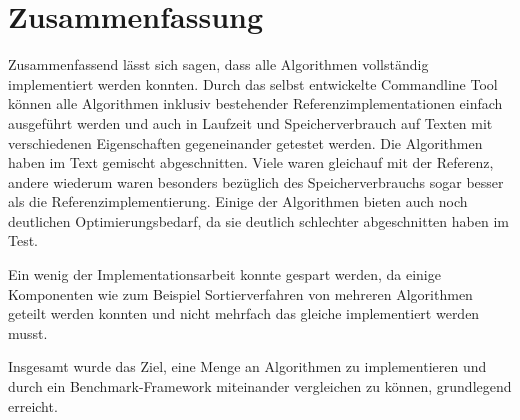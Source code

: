 \section{Zusammenfassung}

Zusammenfassend  lässt sich sagen,
dass alle Algorithmen vollständig implementiert werden konnten. Durch das selbst entwickelte
Commandline Tool können alle Algorithmen inklusiv bestehender Referenzimplementationen einfach ausgeführt werden
und auch in Laufzeit und Speicherverbrauch auf Texten mit verschiedenen Eigenschaften gegeneinander getestet werden.
Die Algorithmen haben im Text gemischt abgeschnitten.
Viele waren gleichauf mit der Referenz, andere wiederum waren besonders bezüglich des Speicherverbrauchs sogar besser als die Referenzimplementierung.
Einige der Algorithmen bieten auch noch deutlichen Optimierungsbedarf, da sie deutlich schlechter abgeschnitten haben im Test.

Ein wenig der Implementationsarbeit konnte gespart werden,
da einige Komponenten wie zum Beispiel Sortierverfahren von mehreren Algorithmen geteilt werden konnten
und nicht mehrfach das gleiche implementiert werden musst.

Insgesamt wurde das Ziel, eine Menge an Algorithmen zu implementieren und durch ein Benchmark-Framework miteinander vergleichen zu können,
grundlegend erreicht.
